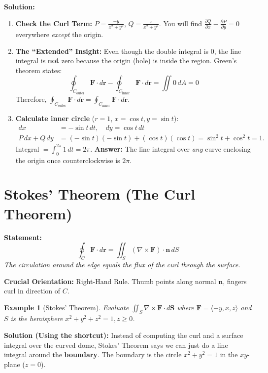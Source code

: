 \documentclass[11pt]{article}
\newtheorem{example}{Example}[section]
\newcommand{\F}{\mathbf{F}}
\newcommand{\curl}{\nabla \times}
\begin{document}
\textbf{Solution:}
\begin{enumerate}
    \item \textbf{Check the Curl Term:} $P = \frac{-y}{x^2+y^2}$, $Q = \frac{x}{x^2+y^2}$.
    You will find $\frac{\partial Q}{\partial x} - \frac{\partial P}{\partial y} = 0$ everywhere \textit{except} the origin.
    \item \textbf{The ``Extended'' Insight:} Even though the double integral is $0$, the line integral is \textbf{not} zero because the origin (hole) is inside the region. Green's theorem states:
    \[
    \oint_{C_{\text{outer}}} \F \cdot d\mathbf{r} - \oint_{C_{\text{inner}}} \F \cdot d\mathbf{r} = \iint 0 \, dA = 0
    \]
    Therefore, $\oint_{C_{\text{outer}}} \F \cdot d\mathbf{r} = \oint_{C_{\text{inner}}} \F \cdot d\mathbf{r}$.
    \item \textbf{Calculate inner circle} ($r=1$, $x=\cos t, y=\sin t$):
    \begin{align*}
        dx &= -\sin t\,dt, \quad dy = \cos t\,dt \\
        P\,dx + Q\,dy &= (-\sin t)(-\sin t) + (\cos t)(\cos t) = \sin^2 t + \cos^2 t = 1.
    \end{align*}
    Integral $= \int_0^{2\pi} 1 \, dt = 2\pi$.
    \textbf{Answer:} The line integral over \textit{any} curve enclosing the origin once counterclockwise is $2\pi$.
\end{enumerate}

\section{Stokes' Theorem (The Curl Theorem)}

\textbf{Statement:}
\[
\oint_C \F \cdot d\mathbf{r} = \iint_S (\curl \F) \cdot \mathbf{n} \, dS
\]
\textit{The circulation around the edge equals the flux of the curl through the surface.}

\textbf{Crucial Orientation:} Right-Hand Rule. Thumb points along normal $\mathbf{n}$, fingers curl in direction of $C$.

\begin{example}[Stokes' Theorem]
Evaluate $\iint_S \curl \F \cdot d\mathbf{S}$ where $\F = \langle -y, x, z \rangle$ and $S$ is the hemisphere $x^2+y^2+z^2=1, z \ge 0$.
\end{example}

\textbf{Solution (Using the shortcut):}
Instead of computing the curl and a surface integral over the curved dome, Stokes' Theorem says we can just do a line integral around the \textbf{boundary}.
The boundary is the circle $x^2+y^2=1$ in the $xy$-plane ($z=0$).
\end{document}
